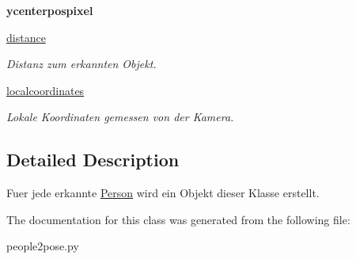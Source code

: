 \begin{DoxyCompactItemize}
\item 
\hypertarget{classpeople2pose_1_1Person_ab0878593fb0750912a024f198f7fe0d0}{{\bfseries ycenterpospixel}}\label{classpeople2pose_1_1Person_ab0878593fb0750912a024f198f7fe0d0}

\item 
\hypertarget{classpeople2pose_1_1Person_a5b33d643d5e45f55f0d7bd28fe0b4824}{\hyperlink{classpeople2pose_1_1Person_a5b33d643d5e45f55f0d7bd28fe0b4824}{distance}}\label{classpeople2pose_1_1Person_a5b33d643d5e45f55f0d7bd28fe0b4824}

\begin{DoxyCompactList}\small\item\em Distanz zum erkannten Objekt. \end{DoxyCompactList}\item 
\hypertarget{classpeople2pose_1_1Person_a703219be30c24d26a429ff7c3908737a}{\hyperlink{classpeople2pose_1_1Person_a703219be30c24d26a429ff7c3908737a}{localcoordinates}}\label{classpeople2pose_1_1Person_a703219be30c24d26a429ff7c3908737a}

\begin{DoxyCompactList}\small\item\em Lokale Koordinaten gemessen von der Kamera. \end{DoxyCompactList}\end{DoxyCompactItemize}


\subsection{Detailed Description}
Fuer jede erkannte \hyperlink{classpeople2pose_1_1Person}{Person} wird ein Objekt dieser Klasse erstellt. 

The documentation for this class was generated from the following file\-:\begin{DoxyCompactItemize}
\item 
people2pose.\-py\end{DoxyCompactItemize}
